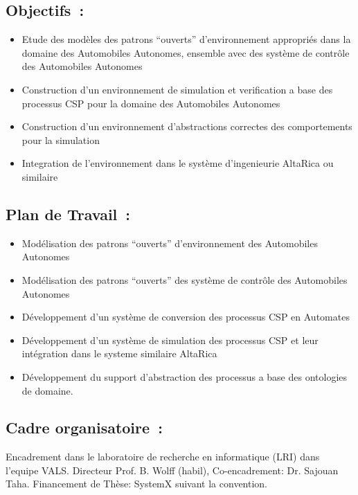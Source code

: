 \documentclass[a4paper,10pt]{article}
\begin{document}
\subsection*{Objectifs~:}
\begin{itemize}
\item Etude des modèles  des patrons ``ouverts''  d'environnement 
         appropriés dans la domaine des Automobiles Autonomes, ensemble avec 
         des système de contrôle des Automobiles Autonomes
\item Construction d'un environnement de simulation et verification a base des
         processus CSP pour la domaine  des Automobiles Autonomes
\item Construction d'un environnement d'abstractions correctes des comportements
         pour la simulation
\item Integration de l'environnement dans le système d'ingenieurie AltaRica ou similaire
\end{itemize}

\subsection*{Plan de Travail~:}
\begin{itemize}
\item Modélisation des patrons ``ouverts''  d'environnement des Automobiles Autonomes 
\item Modélisation des patrons ``ouverts'' des système de contrôle des Automobiles Autonomes 
\item Développement d'un système de conversion des processus CSP en Automates
\item Développement d'un système de simulation des processus CSP et leur
         intégration dans le systeme similaire AltaRica 
\item Développement du support d'abstraction des processus a base des ontologies de domaine.
\end{itemize}

\subsection*{Cadre organisatoire~:}
Encadrement dans le laboratoire de recherche en informatique (LRI) dans l'equipe VALS.
Directeur Prof. B. Wolff (habil), Co-encadrement: Dr. Sajouan Taha.
Financement de Thèse: SystemX suivant la convention. 



\end{document}
